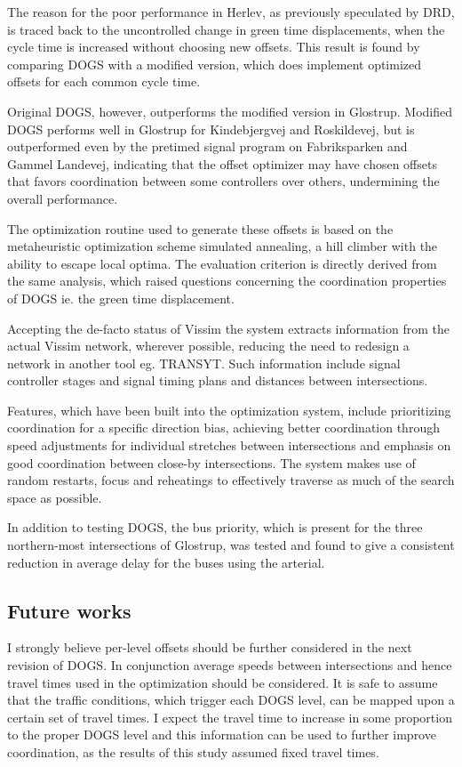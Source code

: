 The reason for the poor performance in Herlev, as previously speculated by DRD, is traced back to the uncontrolled change in green time displacements, when the cycle time is increased without choosing new offsets. This result is found by comparing DOGS with a modified version, which does implement optimized offsets for each common cycle time. 

Original DOGS, however, outperforms the modified version in Glostrup. Modified DOGS performs well in Glostrup for Kindebjergvej and Roskildevej, but is outperformed even by the pretimed signal program on Fabriksparken and Gammel Landevej, indicating that the offset optimizer may have chosen offsets that favors coordination between some controllers over others, undermining the overall performance.

The optimization routine used to generate these offsets is based on the metaheuristic optimization scheme simulated annealing, a hill climber with the ability to escape local optima. The evaluation criterion is directly derived from the same analysis, which raised questions concerning the coordination properties of DOGS ie. the green time displacement.

Accepting the de-facto status of Vissim the system extracts information from the actual Vissim network, wherever possible, reducing the need to redesign a network in another tool eg. TRANSYT. Such information include signal controller stages and signal timing plans and distances between intersections.

Features, which have been built into the optimization system, include prioritizing coordination for a specific direction bias, achieving better coordination through speed adjustments for individual stretches between intersections and emphasis on good coordination between close-by intersections. The system makes use of random restarts, focus and reheatings to effectively traverse as much of the search space as possible.

In addition to testing DOGS, the bus priority, which is present for the three northern-most intersections of Glostrup, was tested and found to give a consistent reduction in average delay for the buses using the arterial.

\subsection{Future works}
I strongly believe per-level offsets should be further considered in the next revision of DOGS. In conjunction average speeds between intersections and hence travel times used in the optimization should be considered. It is safe to assume that the traffic conditions, which trigger each DOGS level, can be mapped upon a certain set of travel times. I expect the travel time to increase in some proportion to the proper DOGS level and this information can be used to further improve coordination, as the results of this study assumed fixed travel times.

